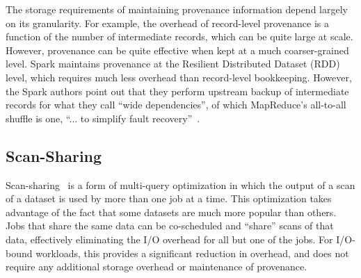 The storage requirements of maintaining provenance information depend largely
on its granularity. For example, the overhead of record-level provenance is a
function of the number of intermediate records, which can be quite large at
scale.  However, provenance can be quite effective when kept at a much
coarser-grained level.  Spark maintains provenance at the Resilient Distributed
Dataset (RDD) level, which requires much less overhead than record-level
bookkeeping. However, the Spark authors point out that they perform upstream
backup of intermediate records for what they call ``wide dependencies'', of
which MapReduce's all-to-all shuffle is one, ``... to simplify fault
recovery''~\cite{spark}.

\subsection{Scan-Sharing}

Scan-sharing~\cite{qptmd} is a form of multi-query optimization
in which the output of a scan of a dataset is used by more than one job at a
time. This optimization takes advantage of the fact that some datasets are much
more popular than others. Jobs that share the same data can be co-scheduled and
``share'' scans of that data, effectively eliminating the I/O overhead for all
but one of the jobs.  For I/O-bound workloads, this provides a significant
reduction in overhead, and does not require any additional storage overhead or
maintenance of provenance.
